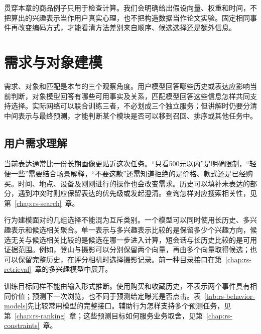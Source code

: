 贯穿本章的商品例子只用于检查计算。我们会明确给出假设向量、权重和时间，不把算出的兴趣表示当作用户真实心理，也不把构造数据当作论文实验。固定相同事件再改变编码方式，才能看清方法差别来自顺序、候选选择还是额外信息。

\section{需求与对象建模}
\label{sec:rs-understanding-models}

需求、对象和匹配是本节的三个观察角度。用户模型回答哪些历史或表达应影响当前判断，对象模型回答有哪些可用事实及关系，匹配模型回答这些信息怎样共同支持选择。实际网络可以联合训练三者，不必划成三个独立服务；但讲解时仍要分清中间表示与最终预测，才能判断某个模块是否可以移到召回、排序或其他任务中。

\subsection{用户需求理解}
\label{sec:rs-user-understanding}

当前表达通常比一份长期画像更贴近这次任务。“只看500元以内”是明确限制，“轻便一些”需要结合场景解释，“不要这款”还需知道拒绝的是价格、款式还是已经购买。时间、地点、设备及刚刚进行的操作也会改变需求。历史可以填补未表达的部分，遇到冲突时则应保留表达的优先级或发起澄清。查询怎样对应搜索相关性，见第~\ref{chap:rs-search}~章。

行为建模面对的几组选择不能混为互斥类别。一个模型可以同时使用长历史、多兴趣表示和候选相关聚合。单一表示与多兴趣表示比较的是保留多少个兴趣方向，候选无关与候选相关比较的是候选在哪一步进入计算，短会话与长历史比较的是可用证据范围。例如，登山与摄影可以分别保留两个向量，再由多个向量取得候选；也可以保留完整历史，在评分相机时选择摄影记录。前一种目录接口在第~\ref{chap:rs-retrieval}~章的多兴趣模型中展开。

训练目标同样不能由输入形式推断。使用购买和收藏历史，不表示两个事件具有相同价值；预测下一次浏览，也不同于预测给定曝光是否点击。表~\ref{tab:rs-behavior-models}先比较常用模型的完整接口。辅助行为怎样支持多个预测任务，见第~\ref{chap:rs-ranking}~章；这些预测目标如何服务业务取舍，见第~\ref{chap:rs-constraints}~章。

